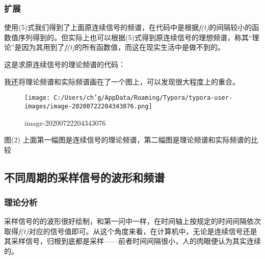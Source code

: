 \documentclass[]{article}
\newenvironment{Shaded}{}{}
\newcommand{\CommentTok}[1]{\textcolor[rgb]{0.38,0.63,0.69}{\textit{#1}}}
\newcommand{\FloatTok}[1]{\textcolor[rgb]{0.25,0.63,0.44}{#1}}
\newcommand{\NormalTok}[1]{#1}
\newcommand{\StringTok}[1]{\textcolor[rgb]{0.25,0.44,0.63}{#1}}
\begin{document}
\hypertarget{header-n37}{%
\subsubsection{扩展}\label{header-n37}}

使用(5)式我们得到了上面原连续信号的频谱，在代码中是根据\emph{f(t)}的间隔较小的函数值序列得到的。但实际上也可以根据(5)式得到原连续信号的理想频谱，称其``理论''是因为其用到了\emph{f(t)}的所有函数值，而这在现实生活中是做不到的。

这是求原连续信号的理论频谱的代码：

\begin{Shaded}
\end{Shaded}

我还将理论频谱和实际频谱画在了一个图上，可以发现很大程度上的重合。

\begin{figure}
\centering
\texttt{[image: C:/Users/ch'g/AppData/Roaming/Typora/typora-user-images/image-20200722204343076.png]}
\caption{image-20200722204343076}
\end{figure}

图(2)
上面第一幅图是连续信号的理论频谱，第二幅图是理论频谱和实际频谱的比较

\hypertarget{header-n45}{%
\subsection{不同周期的采样信号的波形和频谱}\label{header-n45}}

\hypertarget{header-n46}{%
\subsubsection{理论分析}\label{header-n46}}

采样信号的的波形很好绘制，和第一问中一样，在时间轴上按规定的时间间隔依次取得\emph{f(t)}对应的信号值即可。从这个角度来看，在计算机中，无论是连续信号还是其采样信号，归根到底都是采样------前者时间间隔很小，人的肉眼便认为其实连续的。
\end{document}

